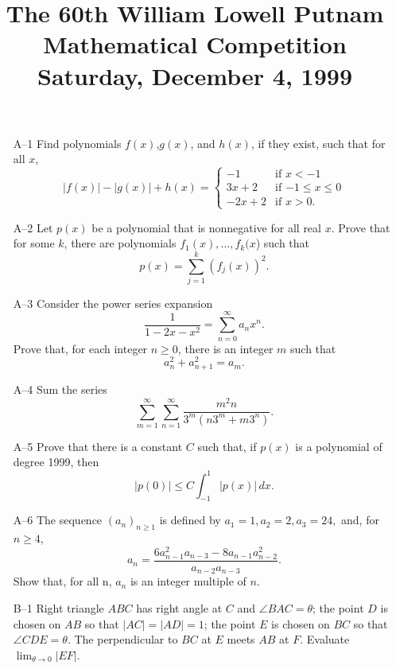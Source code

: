 \documentclass[amssymb,twocolumn,pra,10pt,aps]{revtex4-1}
\begin{document}
\title{The 60th William Lowell Putnam Mathematical Competition \\
    Saturday, December 4, 1999}
\maketitle

\begin{itemize}
\item[A--1]
Find polynomials $f(x)$,$g(x)$, and $h(x)$, if they exist, such
that for all $x$,
\[
|f(x)|-|g(x)|+h(x) = \begin{cases} -1 & \mbox{if $x<-1$} \\
                     3x+2 & \mbox{if $-1 \leq x \leq 0$} \\
                     -2x+2 & \mbox{if $x>0$.}
                     \end{cases}
\]

\item[A--2]
Let $p(x)$ be a polynomial that is nonnegative for all real $x$.  Prove that
for some $k$, there are polynomials $f_1(x),\dots,f_k(x$) such that
\[p(x) =  \sum_{j=1}^k (f_j(x))^2.\]

\item[A--3]
Consider the power series expansion
\[\frac{1}{1-2x-x^2} = \sum_{n=0}^\infty a_n x^n.\]
Prove that, for each integer $n\geq 0$, there is an integer $m$ such that
\[a_n^2 + a_{n+1}^2 = a_m .\]

\item[A--4]
Sum the series
\[\sum_{m=1}^\infty \sum_{n=1}^\infty \frac{m^2 n}{3^m(n3^m+m3^n)}.\]

\item[A--5]
Prove that there is a constant $C$ such that, if $p(x)$ is a polynomial
of degree 1999, then
\[|p(0)|\leq C \int_{-1}^1 |p(x)|\,dx.\]

\item[A--6]
The sequence $(a_n)_{n\geq 1}$ is defined by $a_1=1, a_2=2, a_3=24,$ and, for $n\geq 4$,
\[a_n = \frac{6a_{n-1}^2a_{n-3} -
8a_{n-1}a_{n-2}^2}{a_{n-2}a_{n-3}}.\]
Show that, for all n, $a_n$ is an integer multiple of $n$.

\item[B--1]
Right triangle $ABC$ has right angle at $C$ and $\angle BAC =\theta$;
the point $D$ is chosen on $AB$ so that $|AC|=|AD|=1$; the point $E$
is chosen on $BC$ so that $\angle CDE = \theta$.  The perpendicular
to $BC$ at $E$ meets $AB$ at $F$.  Evaluate $\lim_{\theta\rightarrow 0}
|EF|$.


\end{itemize}
\end{document}
